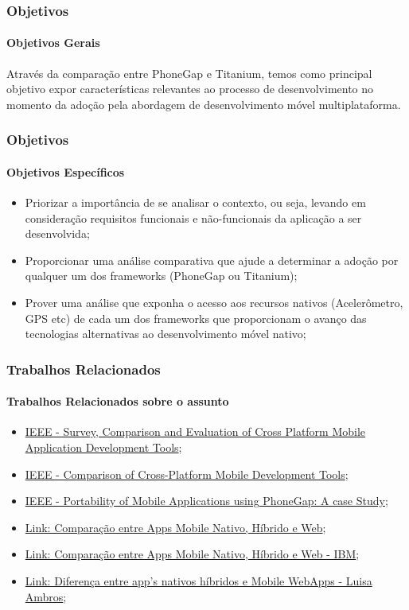 \documentclass[10pt]{beamer}
\begin{document}
\begin{frame}
	\frametitle{Objetivos}
	\framesubtitle{Objetivos Gerais}
	Através da comparação entre PhoneGap e Titanium, temos como principal objetivo expor características relevantes ao processo de desenvolvimento no momento da adoção pela abordagem de desenvolvimento móvel multiplataforma.
\end{frame}

\begin{frame}
	\frametitle{Objetivos}
	\framesubtitle{Objetivos Específicos}
	\begin{itemize}
		\item Priorizar a importância de se analisar o contexto, ou seja, levando em consideração requisitos funcionais e não-funcionais da aplicação a ser desenvolvida;
		\item Proporcionar uma análise comparativa que ajude a determinar a adoção por qualquer um dos frameworks (PhoneGap ou Titanium);
		\item Prover uma análise que exponha o acesso aos recursos nativos (Acelerômetro, GPS etc) de cada um dos frameworks que proporcionam o avanço das tecnologias alternativas ao desenvolvimento móvel nativo;
	\end{itemize}
\end{frame}

\begin{frame}
	\frametitle{Trabalhos Relacionados}
	\framesubtitle{Trabalhos Relacionados sobre o assunto}
	\begin{itemize}
			\item \href{http://ieeexplore.ieee.org/stamp/stamp.jsp?arnumber=6583580} {IEEE - Survey, Comparison and Evaluation of Cross Platform Mobile Application Development Tools};
			\item \href{http://ieeexplore.ieee.org/stamp/stamp.jsp?arnumber=6376023}{IEEE - Comparison of Cross-Platform Mobile Development Tools};
			\item \href{http://ieeexplore.ieee.org/stamp/stamp.jsp?arnumber=6549324}{IEEE - Portability of Mobile Applications using PhoneGap: A case Study};
			\item \href{http://www.nngroup.com/articles/mobile-native-apps/}{Link: Comparação entre Apps Mobile Nativo, Híbrido e Web};
			\item \href{https://www.ibm.com/developerworks/community/blogs/ctaurion/entry/desenvolvimento_de_apps-parte_2_hibrido_nativo_ou_web?lang=en}{Link: Comparação entre Apps Mobile Nativo, Híbrido e Web - IBM};
			\item \href{http://luisaambros.com/blog/diferenca-entre-aplicativos-nativos-hibridos-e-mobile-web-apps/}{Link: Diferença entre app's nativos híbridos e Mobile WebApps - Luisa Ambros};
	\end{itemize}
\end{frame}
\end{document}
